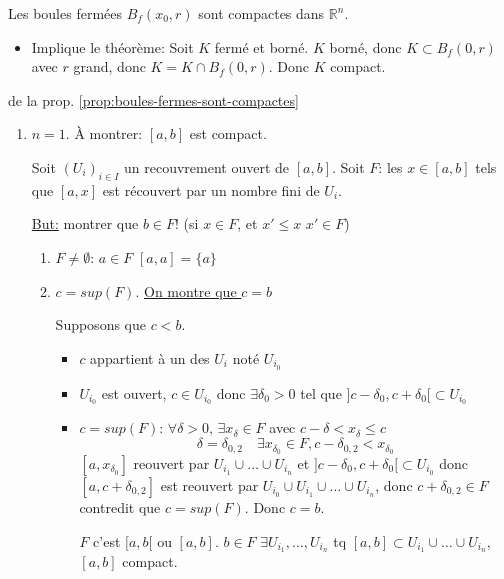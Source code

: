 \documentclass[a4paper]{report}
\newcommand\R{\ensuremath{\mathbb{R}}}
\renewcommand\O{\ensuremath{\emptyset}}
\theoremstyle{definition}
\begin{document}
\begin{prop}\label{prop:boules-fermes-sont-compactes}
   Les boules fermées $B_f(x_0, r)$ sont compactes dans $\R^n$. 
\end{prop}
\begin{itemize}
    \item Implique le théorème: Soit $K$ fermé et borné.  $K$ borné, donc  $K \subset B_f(0, r)$ avec $r$ grand, donc  $K = K \cap B_f(0, r)$. Donc  $K$ compact.
\end{itemize}
\begin{preuve} de la prop. \ref{prop:boules-fermes-sont-compactes}
   \begin{enumerate}
       \item $n = 1$.  À montrer: $[a, b]$ est compact.
           \par
           Soit  $(U_i)_{i \in I}$ un recouvrement ouvert de $[a, b]$. Soit  $F$: les  $x \in [a, b]$ tels que  $[a, x]$ est récouvert par un nombre fini de  $U_i$.
           \par
           \underline{But:} montrer que  $b \in F$! (si $x \in F$, et  $x' \le x$ $x' \in F$)
            \begin{enumerate}
                \item $F \neq \O$: $a \in F$  $[a, a] = \{ a \}$
                \item  $c = sup(F)$. \underline{On montre que $c = b$} \par
                    Supposons que $c < b$.
                     \begin{itemize}
                        \item $c$ appartient à un des  $U_i$ noté  $U_{i_0}$
                        \item $U_{i_0}$ est ouvert, $c \in U_{i_0}$ donc $\exists \delta_0 > 0$ tel que $]c - \delta_0, c + \delta_0[ \subset U_{i_0}$
                        \item $c = sup(F)$:  $\forall \delta > 0, \, \exists x_{\delta} \in F$ avec $c - \delta < x_{\delta} \le c$
                            \[
                            \delta = \delta_{0,2} \quad \exists x_{\delta_0} \in F, c - \delta_{0,2} < x_{\delta_0}
                            \] 
                            $[a, x_{\delta_0}]$ reouvert par $U_{i_1} \cup \ldots \cup U_{i_n}$ et $]c - \delta_0, c + \delta_0[ \subset U_{i_0}$ donc $[a, c + \delta_{0,2}]$ est reouvert par $U_{i_0} \cup U_{i_1} \cup \ldots \cup U_{i_n}$, donc $c + \delta_{0, 2} \in F$ contredit que $c = sup(F)$. Donc  $c = b$.
                            \par
                            $F$ c'est  $[a, b[$ ou $[a, b]$.  $b \in F$  $\exists U_{i_1}, \ldots, U_{i_n}$ tq $[a, b] \subset U_{i_1} \cup \ldots \cup U_{i_n}$, $[a, b]$ compact.
                    \end{itemize}
            \end{enumerate}
   \end{enumerate}
\end{preuve}
\end{document}
